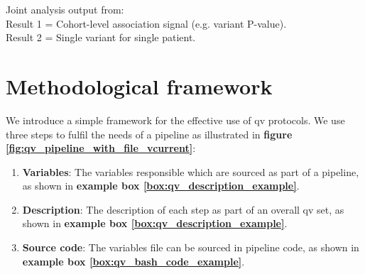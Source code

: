 \begin{tcolorbox}[
    colback=white!0,  %
    colframe=black,  %
    boxrule=1pt,  %
    arc=1mm,  %
    outer arc=1mm,
   title=\textbf{\refstepcounter{myboxcounter}\label{box:pipe}Box \themyboxcounter: Example diagrammatic representation}
]


Joint analysis output from:\\
Result 1 = Cohort-level association signal (e.g. variant P-value). \\
Result 2 = Single variant for single patient.
\end{tcolorbox}


\section{Methodological framework}
We introduce 
a simple framework for the effective use of \ac{qv} protocols.
We use three steps to fulfil the needs of a pipeline as illustrated in 
\textbf{figure 
\ref{fig:qv_pipeline_with_file_vcurrent}}:
\begin{enumerate}
\item \textbf{Variables}: The variables responsible which are sourced as part of a pipeline, as shown in \textbf{example box \ref{box:qv_description_example}}.
\item \textbf{Description}: The description of each step as part of an overall \ac{qv} set, as shown in \textbf{example box \ref{box:qv_description_example}}.
\item \textbf{Source code}: The variables file can be sourced in pipeline code, as shown in \textbf{example box \ref{box:qv_bash_code_example}}.
\end{enumerate}


